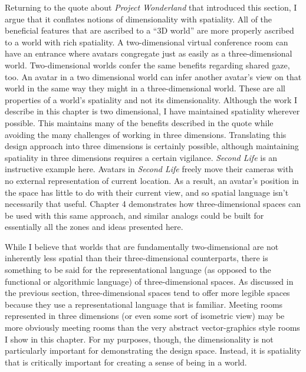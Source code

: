 Returning to the quote about \emph{Project Wonderland} that introduced this section, I argue that it conflates notions of dimensionality with spatiality. All of the beneficial features that are ascribed to a ``3D world'' are more properly ascribed to a world with rich spatiality. A two-dimensional virtual conference room can have an entrance where avatars congregate just as easily as a three-dimensional world. Two-dimensional worlds confer the same benefits regarding shared gaze, too. An avatar in a two dimensional world can infer another avatar's view on that world in the same way they might in a three-dimensional world. These are all properties of a world's spatiality and not its dimensionality. Although the work I describe in this chapter is two dimensional, I have maintained spatiality wherever possible. This maintains many of the benefits described in the quote while avoiding the many challenges of working in three dimensions. Translating this design approach into three dimensions is certainly possible, although maintaining spatiality in three dimensions requires a certain vigilance. \emph{Second Life} is an instructive example here. Avatars in \emph{Second Life} freely move their cameras with no external representation of current location. As a result, an avatar's position in the space has little to do with their current view, and so spatial language isn't necessarily that useful.  Chapter 4 demonstrates how three-dimensional spaces can be used with this same approach, and similar analogs could be built for essentially all the zones and ideas presented here.

While I believe that worlds that are fundamentally two-dimensional are not inherently less spatial than their three-dimensional counterparts, there is something to be said for the representational language (as opposed to the functional or algorithmic language) of three-dimensional spaces. As discussed in the previous section, three-dimensional spaces tend to offer more legible spaces because they use a representational language that is familiar. Meeting rooms represented in three dimensions (or even some sort of isometric view) may be more obviously meeting rooms than the very abstract vector-graphics style rooms I show in this chapter. For my purposes, though, the dimensionality is not particularly important for demonstrating the design space. Instead, it is spatiality that is critically important for creating a sense of being in a world.


